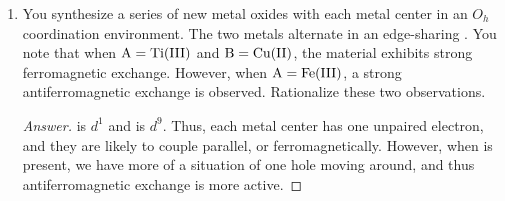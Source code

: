 \documentclass[../psets.tex]{subfiles}
\begin{document}
\begin{enumerate}
\begin{enumerate}
\begin{proof}[Answer]
        \end{proof}
        \item {}, $\mu_\text{eff}=8.4\,\mB$.
        \begin{proof}[Answer]
            
        \end{proof}
        \item {}, $\chi T=\SI{11}{\centi\meter\cubed\kelvin\per\mole}$.
        \begin{proof}[Answer]
            
        \end{proof}
    \end{enumerate}
    \item You synthesize a series of new metal oxides with each metal center in an $O_h$ coordination environment. The two metals alternate in an edge-sharing . You note that when $\ce{A}=\ce{Ti(III)}$ and $\ce{B}=\ce{Cu(II)}$, the material exhibits strong ferromagnetic exchange. However, when $\ce{A}=\ce{Fe(III)}$, a strong antiferromagnetic exchange is observed. Rationalize these two observations.
    \begin{proof}[Answer]
         is $d^1$ and  is $d^9$. Thus, each metal center has one unpaired electron, and they are likely to couple parallel, or ferromagnetically. However, when  is present, we have more of a situation of one hole moving around, and thus antiferromagnetic exchange is more active.
    \end{proof}
\end{enumerate}
\end{document}
